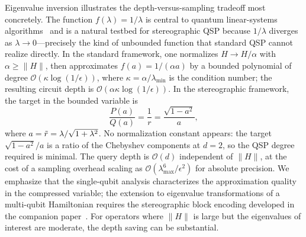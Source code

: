 
Eigenvalue inversion illustrates the depth-versus-sampling
tradeoff most concretely.  The function
$f(\lambda) = 1/\lambda$ is central to quantum linear-systems
algorithms~\cite{HHL2009,ChildsWiebe2012} and is a natural
testbed for stereographic QSP because $1/\lambda$ diverges as
$\lambda \to 0$---precisely the kind of unbounded function that
standard QSP cannot realize directly.  In the standard
framework, one normalizes $H \to H/\alpha$ with
$\alpha \geq \|H\|$, then approximates $f(a) = 1/(\alpha a)$
by a bounded polynomial of degree
$\mathcal{O}(\kappa\log(1/\epsilon))$, where
$\kappa = \alpha/\lambda_{\min}$ is the condition number; the
resulting circuit depth is
$\mathcal{O}(\alpha\kappa\log(1/\epsilon))$.  In the
stereographic framework, the target in the bounded variable is
\begin{equation}
	\frac{P(a)}{Q(a)} = \frac{1}{r} = \frac{\sqrt{1-a^2}}{a},
	\label{eq:inversion-target}
\end{equation}
where $a = \tilde{r} = \lambda/\sqrt{1+\lambda^2}$.  No
normalization constant appears: the target
$\sqrt{1-a^2}/a$ is a ratio of the Chebyshev
components at $d = 2$, so the QSP degree required is
minimal.  The query depth is
$\mathcal{O}(d)$ independent of $\|H\|$, at the cost of a
sampling overhead scaling as
$\mathcal{O}(\lambda_{\max}^6/\epsilon^2)$ for absolute
precision.  We emphasize that the single-qubit analysis
characterizes the approximation quality in the compressed
variable; the extension to eigenvalue transformations of a
multi-qubit Hamiltonian requires the stereographic block
encoding developed in the companion
paper~\cite{KharaziLeytonOrtega2026b}.  For operators where
$\|H\|$ is large but the eigenvalues of interest are moderate,
the depth saving can be substantial.


